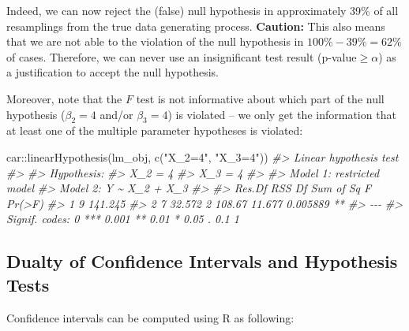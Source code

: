 \documentclass[
  14pt,
]{memoir}
\newenvironment{Shaded}{\begin{snugshade}}{\end{snugshade}}
\newcommand{\CommentTok}[1]{\textcolor[rgb]{0.56,0.35,0.01}{\textit{#1}}}
\newcommand{\FunctionTok}[1]{\textcolor[rgb]{0.00,0.00,0.00}{#1}}
\newcommand{\NormalTok}[1]{#1}
\newcommand{\SpecialCharTok}[1]{\textcolor[rgb]{0.00,0.00,0.00}{#1}}
\newcommand{\StringTok}[1]{\textcolor[rgb]{0.31,0.60,0.02}{#1}}
\begin{document}
Indeed, we can now reject the (false) null hypothesis in approximately 39\% of all resamplings from the true data generating process. \textbf{Caution:} This also means that we are not able to  the violation of the null hypothesis in \(100\%-39\%=62\%\) of cases. Therefore, we can never use an insignificant test result (p-value\(\geq\alpha\)) as a justification to accept the null hypothesis.

Moreover, note that the \(F\) test is not informative about which part of the null hypothesis (\(\beta_2=4\) and/or \(\beta_3=4\)) is violated -- we only get the information that at least one of the multiple parameter hypotheses is violated:

\begin{Shaded}
\begin{Highlighting}[]
\NormalTok{car}\SpecialCharTok{::}\FunctionTok{linearHypothesis}\NormalTok{(lm\_obj, }\FunctionTok{c}\NormalTok{(}\StringTok{"X\_2=4"}\NormalTok{, }\StringTok{"X\_3=4"}\NormalTok{))}
\CommentTok{\#\textgreater{} Linear hypothesis test}
\CommentTok{\#\textgreater{} }
\CommentTok{\#\textgreater{} Hypothesis:}
\CommentTok{\#\textgreater{} X\_2 = 4}
\CommentTok{\#\textgreater{} X\_3 = 4}
\CommentTok{\#\textgreater{} }
\CommentTok{\#\textgreater{} Model 1: restricted model}
\CommentTok{\#\textgreater{} Model 2: Y \textasciitilde{} X\_2 + X\_3}
\CommentTok{\#\textgreater{} }
\CommentTok{\#\textgreater{}   Res.Df     RSS Df Sum of Sq      F   Pr(\textgreater{}F)   }
\CommentTok{\#\textgreater{} 1      9 141.245                                }
\CommentTok{\#\textgreater{} 2      7  32.572  2    108.67 11.677 0.005889 **}
\CommentTok{\#\textgreater{} {-}{-}{-}}
\CommentTok{\#\textgreater{} Signif. codes:  0 \textquotesingle{}***\textquotesingle{} 0.001 \textquotesingle{}**\textquotesingle{} 0.01 \textquotesingle{}*\textquotesingle{} 0.05 \textquotesingle{}.\textquotesingle{} 0.1 \textquotesingle{} \textquotesingle{} 1}
\end{Highlighting}
\end{Shaded}

\hypertarget{dualty-of-confidence-intervals-and-hypothesis-tests}{%
\subsection{Dualty of Confidence Intervals and Hypothesis Tests}\label{dualty-of-confidence-intervals-and-hypothesis-tests}}

Confidence intervals can be computed using \textsf{R} as following:
\end{document}
